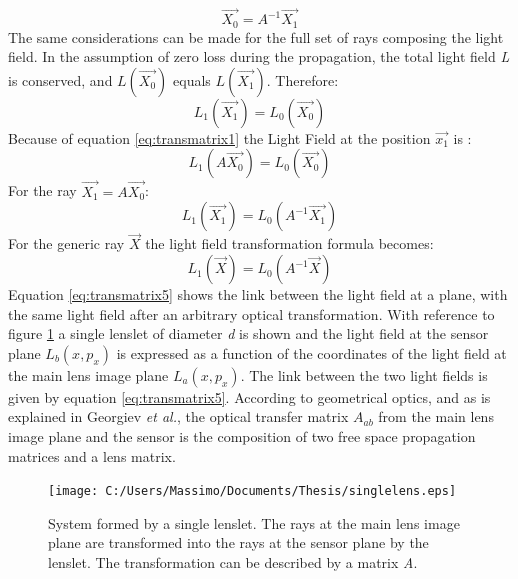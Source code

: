    \begin{equation}
   \label{eq:transmatrix2}
   \overrightarrow{X_0}=A^{-1}\overrightarrow{X_1}
   \end{equation}
   The same considerations can be made for the full set of rays composing the light field. In the assumption of zero loss during the propagation, the total light field \textit{L} is conserved, and $L(\overrightarrow{X_0})$ equals $L(\overrightarrow{X_1})$. Therefore:
   \begin{equation}
   \label{eq:transmatrix3}
   L_1(\overrightarrow{X_1})=L_0(\overrightarrow{X_0})
   \end{equation} 
   Because of equation \ref{eq:transmatrix1} the Light Field at the position $\overrightarrow{x_1}$ is :
   \begin{equation}
   \label{eq:transmatrix4}
   L_1(A\overrightarrow{X_0})=L_0(\overrightarrow{X_0})
   \end{equation}
   For the ray $\overrightarrow{X_1}=A\overrightarrow{X_0}$:
   \begin{equation}
   \label{eq:transmatrix8}
   L_1(\overrightarrow{X_1})=L_0(A^{-1}\overrightarrow{X_1})
   \end{equation}
   For the generic ray $\overrightarrow{X}$ the light field transformation formula becomes:
   \begin{equation}
   \label{eq:transmatrix5}
   L_1(\overrightarrow{X})=L_0(A^{-1}\overrightarrow{X})
   \end{equation}
   Equation \ref{eq:transmatrix5} shows the link between the light field at a plane, with the same light field after an arbitrary optical transformation.
     With reference to figure \ref{fig:basystem} a single lenslet of diameter \textit{d} is shown and the light field at the sensor plane $L_b(x,p_x)$ is expressed as a function of the coordinates of the light field at the main lens image plane $L_a(x,p_x)$. The link between the two light fields is given by equation \ref{eq:transmatrix5}. According to geometrical optics, and as is explained in Georgiev \textit{et al.}\cite{georgiev2011plenoptic}, the optical transfer matrix $A_{ab}$ from the main lens image plane and the sensor is the composition of two free space propagation matrices and a lens matrix.
      \begin{figure}[H]
      	\centering
      	\texttt{[image: C:/Users/Massimo/Documents/Thesis/singlelens.eps]}
      	\caption{\label{fig:basystem} System formed by a single lenslet. The rays at the main lens image plane are transformed into the rays at the sensor plane by the lenslet. The transformation can be described by a matrix \textit{A}. }
      \end{figure}
